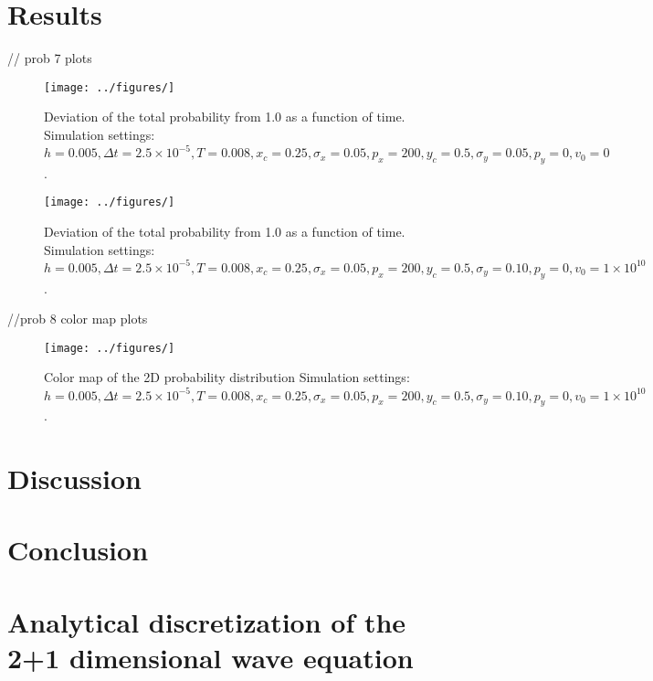 \documentclass[english,notitlepage,reprint,nofootinbib]{revtex4-1}  %
\begin{document}
\section{Results}\label{sec:results}
%
// prob 7 plots
\begin{figure}[H]
    \centering
    \texttt{[image: ../figures/]}
    \caption{Deviation of the total probability from 1.0 as a function of time. Simulation settings: $h = 0.005, \Delta t = 2.5 \times 10^{-5}, T = 0.008, x_c = 0.25, \sigma_x = 0.05, p_x = 200, y_c = 0.5, \sigma_y = 0.05, p_y = 0, v_0 = 0$.}
    \label{fig:}
\end{figure}

\begin{figure}[H]
    \centering
    \texttt{[image: ../figures/]}
    \caption{Deviation of the total probability from 1.0 as a function of time. Simulation settings: $h = 0.005, \Delta t = 2.5 \times 10^{-5}, T = 0.008, x_c = 0.25, \sigma_x = 0.05, p_x = 200, y_c = 0.5, \sigma_y = 0.10, p_y = 0, v_0 = 1 \times 10^{10}$.}
    \label{fig:}
\end{figure}

//prob 8 color map plots
\begin{figure}[H]
    \centering
    \texttt{[image: ../figures/]}
    \caption{Color map of the 2D probability distribution Simulation settings: $h = 0.005, \Delta t = 2.5 \times 10^{-5}, T = 0.008, x_c = 0.25, \sigma_x = 0.05, p_x = 200, y_c = 0.5, \sigma_y = 0.10, p_y = 0, v_0 = 1 \times 10^{10}$.}
    \label{fig:}
\end{figure}



\section{Discussion}\label{sec:discussion}
%


\section{Conclusion}\label{sec:conclusion}

\onecolumngrid

%


\newpage
\appendix

\section{Analytical discretization of the 2+1 dimensional wave equation} \label{appendix:analytic}
\end{document}
